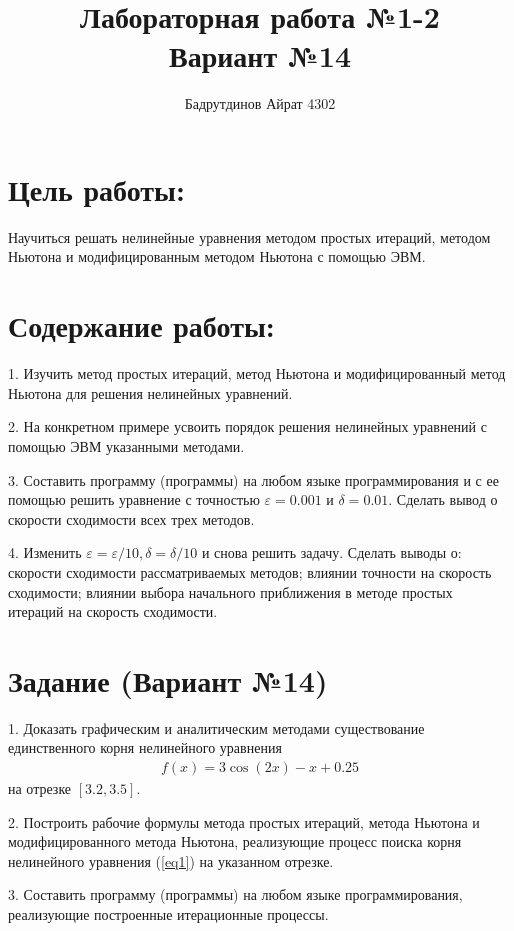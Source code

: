 \documentclass[utf8x, 14pt, oneside, a4paper]{article}
\title{Лабораторная работа №1-2\\
	\large Вариант №14}
\author{Бадрутдинов Айрат 4302}
\begin{document}
\maketitle
\thispagestyle{empty}
\clearpage
\tableofcontents
\clearpage

\section{Цель работы:}
Научиться решать нелинейные уравнения методом простых итераций,
методом Ньютона и модифицированным методом Ньютона с помощью ЭВМ.

\section{Содержание работы:}

1. Изучить метод простых итераций, метод Ньютона и модифицированный метод
   Ньютона для решения нелинейных уравнений.

2. На конкретном примере усвоить порядок решения нелинейных уравнений с помощью
   ЭВМ указанными методами.

3. Составить программу (программы) на любом языке программирования и с ее
   помощью решить уравнение с точностью $\varepsilon = 0.001$ и 
   $\delta = 0.01$. Сделать вывод о скорости сходимости всех трех методов.

4. Изменить $\varepsilon = \varepsilon / 10, \delta = \delta / 10$ и снова
   решить задачу. Сделать выводы о: скорости сходимости рассматриваемых
   методов; влиянии точности на скорость сходимости; влиянии выбора начального
   приближения в методе простых итераций на скорость сходимости.

\section{Задание (Вариант №14)}

1. Доказать графическим и аналитическим методами существование единственного
   корня нелинейного уравнения
   \begin{align}\label{eq1}
   f(x) = 3 \cos(2x) - x + 0.25
   \end{align}
   на отрезке $[3.2, 3.5]$.

2. Построить рабочие формулы метода простых итераций, метода Ньютона и
   модифицированного метода Ньютона, реализующие процесс поиска корня
   нелинейного уравнения (\ref{eq1}) на указанном отрезке.

3. Составить программу (программы) на любом языке программирования, реализующие
   построенные итерационные процессы.
\end{document}
